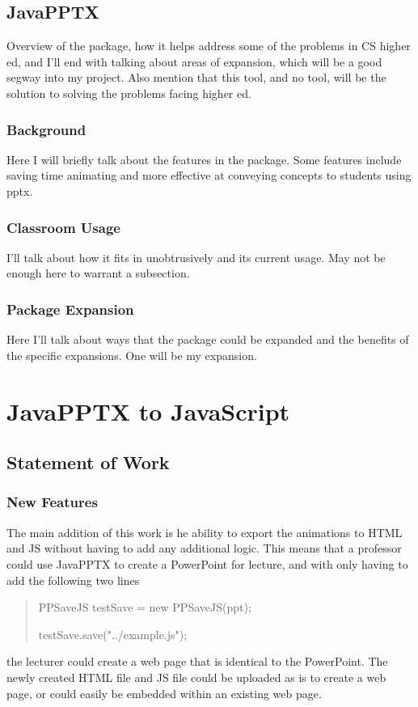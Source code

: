 \documentclass[12pt,twoside]{reedthesis}
\begin{document}
\section{JavaPPTX}
Overview of the package, how it helps address some of the problems in CS higher ed, and I'll end with talking about areas of expansion, which will be a good segway into my project. Also mention that this tool, and no tool, will be the solution to solving the problems facing higher ed.

\subsection{Background}
Here I will briefly talk about the features in the package. Some features include saving time animating and more effective at conveying concepts to students using pptx.


\subsection{Classroom Usage}
I'll talk about how it fits in unobtrusively and its current usage. May not be enough here to warrant a subsection. 
	
\subsection{Package Expansion}
Here I'll talk about ways that the package could be expanded and the benefits of the specific expansions. One will be my expansion. 

\chapter{JavaPPTX to JavaScript}

\section{Statement of Work}

\subsection{New Features}
The main addition of this work is he ability to export the animations to HTML and JS without having to add any additional logic. This means that a professor could use JavaPPTX to create a PowerPoint for lecture, and with only having to add the following two lines
\begin{quote}
PPSaveJS testSave = new PPSaveJS(ppt);

testSave.save("../example.js");
\end{quote}
the lecturer could create a web page that is identical to the PowerPoint. The newly created HTML file and JS file could be uploaded as is to create a web page, or could easily be embedded within an existing web page. 
\end{document}
